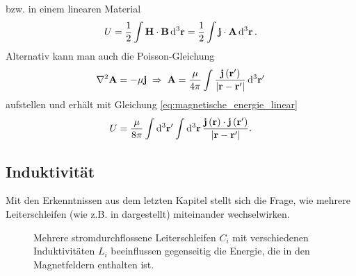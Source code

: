 bzw. in einem linearen Material
\begin{equation}
	\label{eq:magnetische_energie_linear}
	U=\frac{1}{2}\int \vec {H}\cdot \vec {B}\diffa[3]{\vec{r}}=\frac{1}{2}\int \vec {j}\cdot \vec {A}\diffa[3]{\vec{r}}.
\end{equation}
Alternativ kann man auch die Poisson-Gleichung
\begin{equation*}
	\nabla ^{2}\vec {A}=-\mu \vec {j}\implication \vec {A}=\frac{\mu }{4\pi }\int \frac{\vec {j}\left(\vec {r}'\right)}{\left| \vec {r}-\vec {r}'\right| }\diffa[3]{\vec{r}'}
\end{equation*}
aufstellen und erhält mit Gleichung \eqref{eq:magnetische_energie_linear}
\begin{equation*}
	U = \frac{\mu }{8\pi }\int \diffa[3]{\vec {r}'}\int \diffa[3]{\vec {r}}\frac{\vec {j}\left(\vec {r}\right)\cdot \vec {j}\left(\vec {r}'\right)}{\left| \vec {r}-\vec {r}'\right| }.
\end{equation*}

\subsection{Induktivität}

Mit den Erkenntnissen aus dem letzten Kapitel stellt sich die Frage, wie mehrere Leiterschleifen (wie z.B. in  dargestellt) miteinander wechselwirken.

\begin{figure}[ht]
	\centering
	\tfigTwoInductors
	\caption{Mehrere stromdurchflossene Leiterschleifen $C_i$ mit verschiedenen Induktivitäten $L_i$ beeinflussen gegenseitig die Energie, die in den Magnetfeldern enthalten ist. }
	\label{fig:TwoInductors}
\end{figure}

